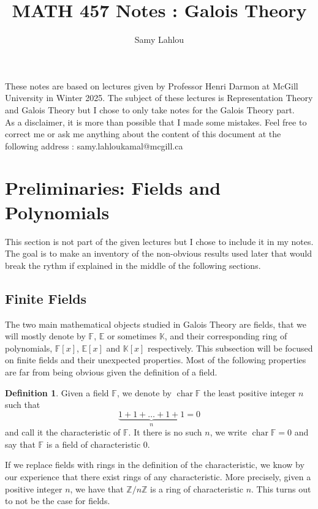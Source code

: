 \documentclass{article}
\title{MATH 457 Notes : Galois Theory}
\author{Samy Lahlou}
\date{}
\theoremstyle{plain}
\theoremstyle{definition}
\newtheorem*{definition}{Definition}
\newcommand{\F}{\mathbb{F}}
\newcommand{\E}{\mathbb{E}}
\newcommand{\K}{\mathbb{K}}
\newcommand{\Zn}[1]{\mathbb{Z}/ #1 \mathbb{Z}}
\DeclareMathOperator{\Char}{char}
\begin{document}
\maketitle

These notes are based on lectures given by Professor Henri Darmon at McGill University in Winter 2025. The subject of these lectures is Representation Theory and Galois Theory but I chose to only take notes for the Galois Theory part. \\
As a disclaimer, it is more than possible that I made some mistakes. Feel free to correct me or ask me anything about the content of this document at the following address : samy.lahloukamal@mcgill.ca

\tableofcontents

\newpage

\section{Preliminaries: Fields and Polynomials}

This section is not part of the given lectures but I chose to include it in my notes. The goal is to make an inventory of the non-obvious results used later that would break the rythm if explained in the middle of the following sections.

\subsection{Finite Fields}

The two main mathematical objects studied in Galois Theory are fields, that we will mostly denote by $\F$, $\E$ or sometimes $\K$, and their corresponding ring of polynomials, $\F[x]$, $\E[x]$ and $\K[x]$ respectively. This subsection will be focused on finite fields and their unexpected properties. Most of the following properties are far from being obvious given the definition of a field. 

\begin{definition}
    Given a field $\F$, we denote by $\Char \F$ the least positive integer $n$ such that
    $$\underbrace{1 + 1 + \dots + 1 + 1}_n = 0$$
    and call it the characteristic of $\F$. It there is no such $n$, we write $\Char \F = 0$ and say that $\F$ is a field of characteristic 0.
\end{definition}

If we replace fields with rings in the definition of the characteristic, we know by our experience that there exist rings of any characteristic. More precisely, given a positive integer $n$, we have that $\Zn{n}$ is a ring of characteristic $n$. This turns out to not be the case for fields.
\end{document}
